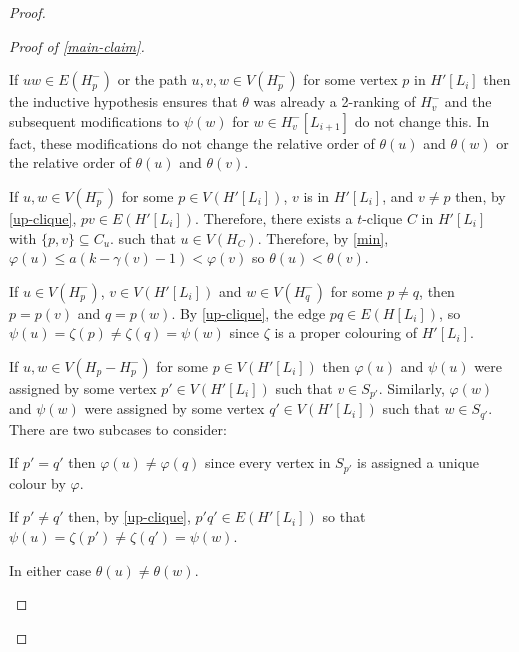 \documentclass[kpfonts]{patmorin}
\theoremstyle{named}
\begin{document}
\begin{proof}
\begin{proof}[Proof of \cref{main-claim}]
\begin{compactenum}
          \item If $uw\in E(H^-_p)$ or the path $u,v,w\in V(H^-_p)$ for some vertex $p$ in $H'[L_i]$ then the inductive hypothesis ensures that $\theta$ was already a 2-ranking of $H^-_v$ and the subsequent modifications to $\psi(w)$ for $w\in H^-_v[L_{i+1}]$ do not change this. In fact, these modifications do not change the relative order of $\theta(u)$ and $\theta(w)$ or the relative order of $\theta(u)$ and $\theta(v)$.

          \item If $u,w\in V(H^-_p)$ for some $p\in V(H'[L_i])$, $v$ is in $H'[L_i]$, and $v\neq p$ then, by \cref{up-clique}, $pv\in E(H'[L_i])$.  Therefore, there exists a $t$-clique $C$ in $H'[L_i]$ with $\{p,v\}\subseteq C_u$. such that $u\in V(H_{C})$.  Therefore, by \cref{min}, $\varphi(u)\le a(k-\gamma(v)-1) < \varphi(v)$ so $\theta(u) < \theta(v)$.

          \item If $u\in V(H^-_{p})$, $v\in V(H'[L_i])$ and $w\in V(H^-_q)$ for some $p\neq q$, then $p=p(v)$ and $q=p(w)$.  By \cref{up-clique}, the edge $pq\in E(H[L_i])$, so $\psi(u)=\zeta(p)\neq\zeta(q)=\psi(w)$ since $\zeta$ is a proper colouring of $H'[L_i]$.

          \item If $u,w\in V(H_{p}-H^-_{p})$ for some $p\in V(H'[L_i])$ then $\varphi(u)$ and $\psi(u)$ were assigned by some vertex $p'\in V(H'[L_i])$ such that $v\in S_{p'}$.  Similarly, $\varphi(w)$ and $\psi(w)$ were assigned by some vertex $q'\in V(H'[L_i])$ such that $w\in S_{q'}$.  There are two subcases to consider:
          \begin{compactenum}
            \item If $p'=q'$ then $\varphi(u)\neq\varphi(q)$ since every vertex in $S_{p'}$ is assigned a unique colour by $\varphi$.
            \item If $p'\neq q'$ then, by \cref{up-clique}, $p'q'\in E(H'[L_i])$ so that $\psi(u)=\zeta(p')\neq\zeta(q')=\psi(w)$.
        \end{compactenum}
        In either case $\theta(u)\neq\theta(w)$.


\end{compactenum}
\end{proof}
\end{proof}
\end{document}
